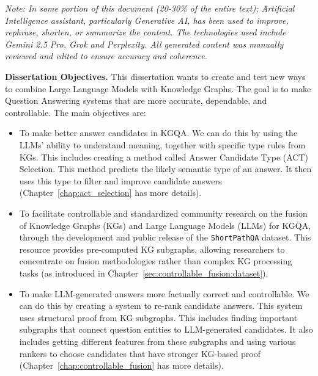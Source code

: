\textit{Note: In some portion of this document (20-30\% of the entire text); Artificial Intelligence assistant, particularly Generative AI, has been used to improve, rephrase, shorten, or summarize the content. The technologies used include Gemini 2.5 Pro, Grok and Perplexity. All generated content was manually reviewed and edited to ensure accuracy and coherence.}

\textbf{Dissertation Objectives.}
This dissertation wants to create and test new ways to combine Large Language Models with Knowledge Graphs. The goal is to make Question Answering systems that are more accurate, dependable, and controllable. The main objectives are:
\begin{itemize}
    \item To make better answer candidates in KGQA. We can do this by using the LLMs' ability to understand meaning, together with specific type rules from KGs. This includes creating a method called Answer Candidate Type (ACT) Selection. This method predicts the likely semantic type of an answer. It then uses this type to filter and improve candidate answers (Chapter~\ref{chap:act_selection} has more details).
    \item To facilitate controllable and standardized community research on the fusion of Knowledge Graphs (KGs) and Large Language Models (LLMs) for KGQA, through the development and public release of the \texttt{ShortPathQA} dataset. This resource provides pre-computed KG subgraphs, allowing researchers to concentrate on fusion methodologies rather than complex KG processing tasks (as introduced in Chapter~\ref{sec:controllable_fusion:dataset}).
    \item To make LLM-generated answers more factually correct and controllable. We can do this by creating a system to re-rank candidate answers. This system uses structural proof from KG subgraphs. This includes finding important subgraphs that connect question entities to LLM-generated candidates. It also includes getting different features from these subgraphs and using various rankers to choose candidates that have stronger KG-based proof (Chapter~\ref{chap:controllable_fusion} has more details).
\end{itemize}


